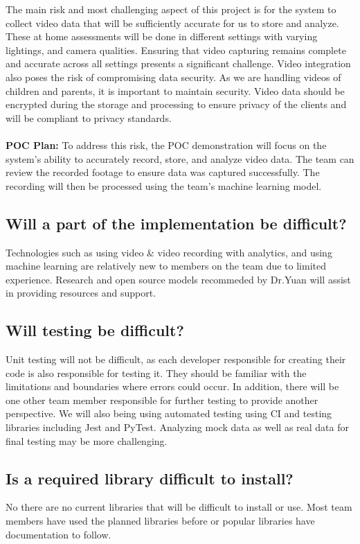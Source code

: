 \documentclass{article}
\begin{document}
 The main risk and most challenging aspect of this project is for the system to collect video data that will be sufficiently accurate for us to store and analyze. 
These at home assessments will be done in different settings with varying lightings, and camera qualities. Ensuring that video capturing remains complete and accurate across all settings presents a significant challenge.  Video integration also poses the risk of compromising data security. As we are handling videos of children and parents, it is important to maintain security. Video data should be encrypted during the storage and processing to ensure privacy of the clients and will be compliant to privacy standards. \\  
\\\textbf{POC Plan:} To address this risk, the POC demonstration will focus on the system's ability to accurately record, store, and analyze video data. The team can review the recorded footage to ensure data was captured successfully. The recording will then be processed using the team's machine learning  model.


\subsection{Will a part of the implementation be difficult?}
Technologies such as using video \& video recording with analytics, and using machine learning are relatively new to members on the team due to limited experience. Research and open source models recommeded by Dr.Yuan will assist in providing resources and support. \\

\subsection{Will testing be difficult?} 
Unit testing will not be difficult, as each developer responsible for creating their code is also responsible for testing it. They should be familiar with the limitations and boundaries where errors could occur. In addition, there will be one other team member responsible for further testing to provide another perspective. We will also being using automated testing using CI and testing libraries including Jest and PyTest. Analyzing mock data as well as real data for final testing may be more challenging. \\

\subsection{Is a required library difficult to install?}
No there are no current libraries that will be difficult to install or use. Most
team members have used the planned libraries before or popular libraries have documentation to
follow.\\
\end{document}
